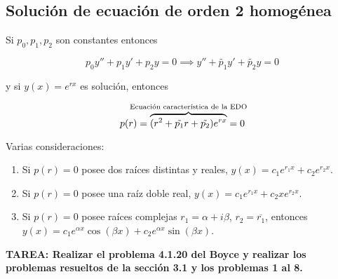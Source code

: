 \subsection{Solución de ecuación de orden 2 homogénea}

Si $p_0, p_1, p_2$ son constantes entonces

\[
    p_0y'' + p_1y' + p_2y = 0 \implies y'' + \tilde{p_1}y' + \tilde{p_2}y = 0
\]

\noindent y si $y(x) = e^{rx}$ es solución, entonces

\[
    p(r) = \LaTeXoverbrace{(r^2 + \tilde{p_1}r + \tilde{p_2})e^{rx}}^{\mathclap{\text{Ecuación característica de la EDO}}} = 0
\]

Varias consideraciones:

\begin{enumerate}
    \item Si $p(r) = 0$ posee dos raíces distintas y reales, $y(x) = c_1e^{r_1x} + c_2e^{r_2x}$.
    \item Si $p(r) = 0$ posee una raíz doble real, $y(x) = c_1e^{r_1x} + c_2xe^{r_2x}$.
    \item Si $p(r) = 0$ posee raíces complejas $r_1 = \alpha + i\beta$, $r_2 = \overline{r_1}$, entonces $y(x) = c_1e^{\alpha x}\cos(\beta x) + c_2e^{\alpha x}\sin(\beta x)$.
\end{enumerate}

\textbf{TAREA: Realizar el problema 4.1.20 del Boyce y realizar los problemas resueltos de la sección 3.1 y los problemas 1 al 8.}
